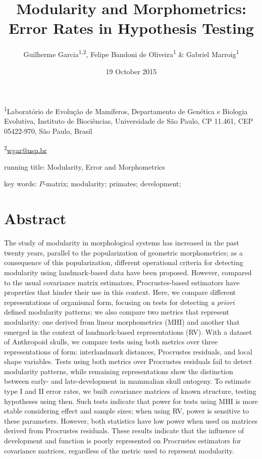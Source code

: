 \documentclass[12pt,]{article}
\title{Modularity and Morphometrics: Error Rates in Hypothesis Testing}
\author{Guilherme Garcia\textsuperscript{1,2}, Felipe Bandoni de
Oliveira\textsuperscript{1} \& Gabriel Marroig\textsuperscript{1}}
\date{19 October 2015}
\begin{document}
\maketitle


\linenumbers
\modulolinenumbers[2]

\onehalfspacing

\textsuperscript{1}Laboratório de Evolução de Mamíferos, Departamento de
Genética e Biologia Evolutiva, Instituto de Biociências, Universidade de
São Paulo, CP 11.461, CEP 05422-970, São Paulo, Brasil

\textsuperscript{2}\href{mailto:wgar@usp.br}{wgar@usp.br}

running title: Modularity, Error and Morphometrics

key words: $P$-matrix; modularity; primates; development;

\section{Abstract}\label{abstract}

The study of modularity in morphological systems has increased in the
past twenty years, parallel to the popularization of geometric
morphometrics; as a consequence of this popularization, different
operational criteria for detecting modularity using landmark-based data
have been proposed. However, compared to the usual covariance matrix
estimators, Procrustes-based estimators have properties that hinder
their use in this context. Here, we compare different representations of
organismal form, focusing on tests for detecting \emph{a priori} defined
modularity patterns; we also compare two metrics that represent
modularity: one derived from linear morphometrics (MHI) and another that
emerged in the context of landmark-based representations (RV). With a
dataset of Anthropoid skulls, we compare tests using both metrics over
three representations of form: interlandmark distances, Procrustes
residuals, and local shape variables. Tests using both metrics over
Procrustes residuals fail to detect modularity patterns, while remaining
representations show the distinction between early- and late-development
in mammalian skull ontogeny. To estimate type I and II error rates, we
built covariance matrices of known structure, testing hypotheses using
then. Such tests indicate that power for tests using MHI is more stable
considering effect and sample sizes; when using RV, power is sensitive
to these parameters. However, both statistics have low power when used
on matrices derived from Procrustes residuals. These results indicate
that the influence of development and function is poorly represented on
Procrustes estimators for covariance matrices, regardless of the metric
used to represent modularity.
\end{document}
